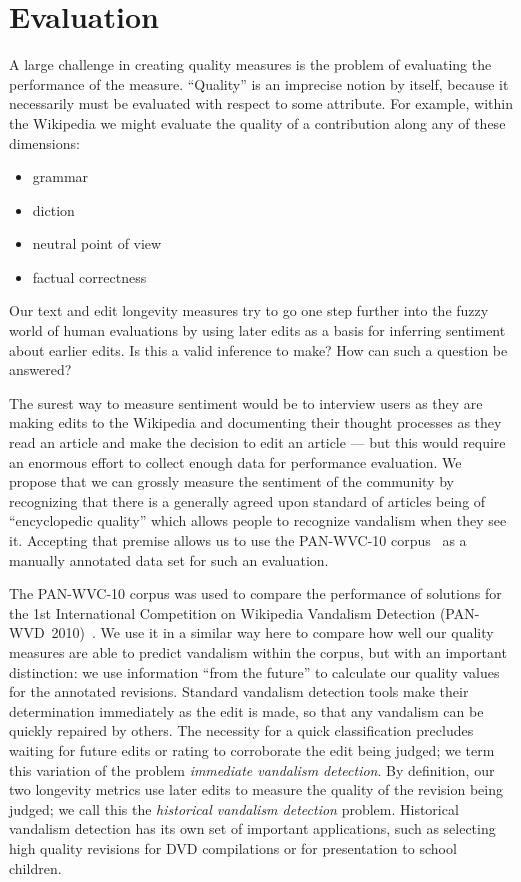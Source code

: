 \section{Evaluation}

A large challenge in creating quality measures is the
problem of evaluating the performance of the measure.
``Quality'' is an imprecise notion by itself, because it
necessarily must be evaluated with respect to some attribute.
For example, within the Wikipedia we might evaluate the quality
of a contribution along any of these dimensions:
\begin{itemize}
\item grammar
\item diction
\item neutral point of view
\item factual correctness
\end{itemize}
Our text and edit longevity measures try to go one step
further into the fuzzy world of human evaluations by using
later edits as a basis for inferring sentiment about earlier edits.
Is this a valid inference to make?
How can such a question be answered?

The surest way to measure sentiment would be to interview
users as they are making edits to the Wikipedia and documenting
their thought processes as they read an article and make the
decision to edit an article --- but this would require an enormous
effort to collect enough data for performance evaluation.
We propose that we can grossly measure the sentiment of the
community by recognizing that there is a generally agreed upon
standard of articles being of ``encyclopedic quality''
which allows people to recognize vandalism when they see it.
Accepting that premise allows us to use the PAN-WVC-10
corpus~\cite{Potthast2010a} as a manually annotated data set for
such an evaluation.

The PAN-WVC-10 corpus was used to compare the performance of
solutions for the 1st International Competition on Wikipedia
Vandalism Detection (PAN-WVD~2010)~\cite{Potthast2010b}.
We use it in a similar way here to compare how well our quality
measures are able to predict vandalism within the corpus,
but with an important distinction:
we use information ``from the future'' to calculate our
quality values for the annotated revisions.
Standard vandalism detection tools make their determination
immediately as the edit is made, so that any vandalism can be
quickly repaired by others.
The necessity for a quick classification precludes waiting
for future edits or rating to corroborate the edit being judged;
we term this variation of the problem \textit{immediate vandalism detection}.
By definition, our two longevity metrics use later edits to
measure the quality of the revision being judged; we call
this the \textit{historical vandalism detection} problem.
Historical vandalism detection has its own set of important
applications, such as selecting high quality revisions for
DVD compilations or for presentation to school children.

